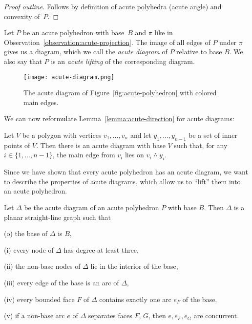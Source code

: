 \begin{proof}[Proof outline]
  Follows by definition of acute polyhedra (acute angle) and convexity of~$P$.
\end{proof}

\begin{definition}
  Let $P$ be an acute polyhedron with base~$B$ and $\pi$ like in Observation~\ref{observation:acute-projection}.
  The image of all edges of $P$ under $\pi$ gives us a diagram, which we call the \emph{acute diagram} of $P$ relative to base $B$. 
  We also say that $P$ is an \emph{acute lifting} of the corresponding diagram.
\end{definition}

\begin{figure}[h]
  \centering
  \texttt{[image: acute-diagram.png]}
  \caption{The acute diagram of Figure~\ref{fig:acute-polyhedron} with colored main edges.}
  \label{fig:acute-diagram}
\end{figure}

We can now reformulate Lemma~\ref{lemma:acute-direction} for acute diagrams:

\begin{corollary}\label{corollary:acute-direction}
  Let $V$ be a polygon with vertices $v_1,\dots,v_n$ and let $y_1,\dots,y_{n-1}$ be a set of inner points of $V$.
  Then there is an acute diagram with base $V$ such that, for any $i \in \{1,\dots,n-1\}$, the main edge from $v_i$ lies on $v_i \wedge y_i$.
\end{corollary}

Since we have shown that every acute polyhedron has an acute diagram, we want to describe the properties of acute diagrams, which allow us to ``lift'' them into an acute polyhedron.

\begin{lemma}\label{lemma:diagram-properties}
  Let $\Delta$ be the acute diagram of an acute polyhedron $P$ with base $B$.
  Then $\Delta$ is a planar straight-line graph such that

  (o) the base of $\Delta$ is $B$,
  
  (i) every node of $\Delta$ has degree at least three,

  (ii) the non-base nodes of $\Delta$ lie in the interior of the base,

  (iii) every edge of the base is an arc of $\Delta$,

  (iv) every bounded face $F$ of $\Delta$ contains exactly one arc $e_F$ of the base,

  (v) if a non-base arc $e$ of $\Delta$ separates faces $F$, $G$, then $e, e_F, e_G$ are concurrent.
\end{lemma}

